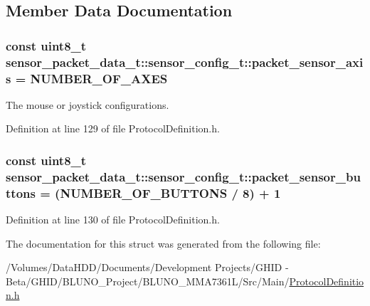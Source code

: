 \subsection{\-Member \-Data \-Documentation}
\hypertarget{structsensor__packet__data__t_1_1sensor__config__t_a08799719eba394b5e4486395e2684ab8}{
\subsubsection[{packet\-\_\-sensor\-\_\-axis}]{\setlength{\rightskip}{0pt plus 5cm}const uint8\-\_\-t {\bf sensor\-\_\-packet\-\_\-data\-\_\-t\-::sensor\-\_\-config\-\_\-t\-::packet\-\_\-sensor\-\_\-axis} = {\bf \-N\-U\-M\-B\-E\-R\-\_\-\-O\-F\-\_\-\-A\-X\-E\-S}}}\label{structsensor__packet__data__t_1_1sensor__config__t_a08799719eba394b5e4486395e2684ab8}


\-The mouse or joystick configurations. 



\-Definition at line 129 of file \-Protocol\-Definition.\-h.

\hypertarget{structsensor__packet__data__t_1_1sensor__config__t_a65f2fd63d76f7ac9326d8f7d6da892e1}{
\subsubsection[{packet\-\_\-sensor\-\_\-buttons}]{\setlength{\rightskip}{0pt plus 5cm}const uint8\-\_\-t {\bf sensor\-\_\-packet\-\_\-data\-\_\-t\-::sensor\-\_\-config\-\_\-t\-::packet\-\_\-sensor\-\_\-buttons} = ({\bf \-N\-U\-M\-B\-E\-R\-\_\-\-O\-F\-\_\-\-B\-U\-T\-T\-O\-N\-S} / 8) + 1}}\label{structsensor__packet__data__t_1_1sensor__config__t_a65f2fd63d76f7ac9326d8f7d6da892e1}


\-Definition at line 130 of file \-Protocol\-Definition.\-h.



\-The documentation for this struct was generated from the following file\-:\begin{DoxyCompactItemize}
\item 
/\-Volumes/\-Data\-H\-D\-D/\-Documents/\-Development Projects/\-G\-H\-I\-D -\/ Beta/\-G\-H\-I\-D/\-B\-L\-U\-N\-O\-\_\-\-Project/\-B\-L\-U\-N\-O\-\_\-\-M\-M\-A7361\-L/\-Src/\-Main/\hyperlink{_protocol_definition_8h}{\-Protocol\-Definition.\-h}\end{DoxyCompactItemize}
